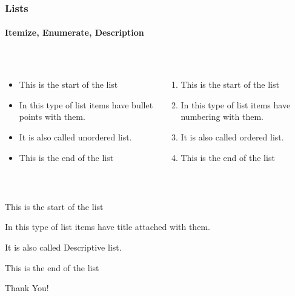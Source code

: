 \documentclass{beamer}
\begin{document}
\begin{frame}[t]
\frametitle{Lists}
\framesubtitle{Itemize, Enumerate, Description}
\begin{columns}
\begin{column}{0.5\textwidth}
 \\
\begin{itemize}
    \item<2-> This is the start of the list
    \item<3-> In this type of list items have bullet points with them.
    \item<4-> It is also called unordered list.
    \item<5-> This is the end of the list
\end{itemize}

\end{column}
\begin{column}{0.5\textwidth}
\\
\begin{enumerate}
    \item<2-> This is the start of the list
    \item<3-> In this type of list items have numbering with them.
    \item<4-> It is also called ordered list.
    \item<5-> This is the end of the list
\end{enumerate}
\end{column}
\end{columns}
\vfill
{}\\
\centering
\begin{description}
    \item<2-> [First] 
    This is the start of the list
    \item<3-> [Second] 
    In this type of list items have title attached  with them.
    \item<4-> [Third]
    It is also called Descriptive list.
    \item<5-> [Fourth]
    This is the end of the list
\end{description}

\end{frame}

\begin{frame}
\begin{center}
\Huge Thank You!
\end{center}
\end{frame}
\end{document}
